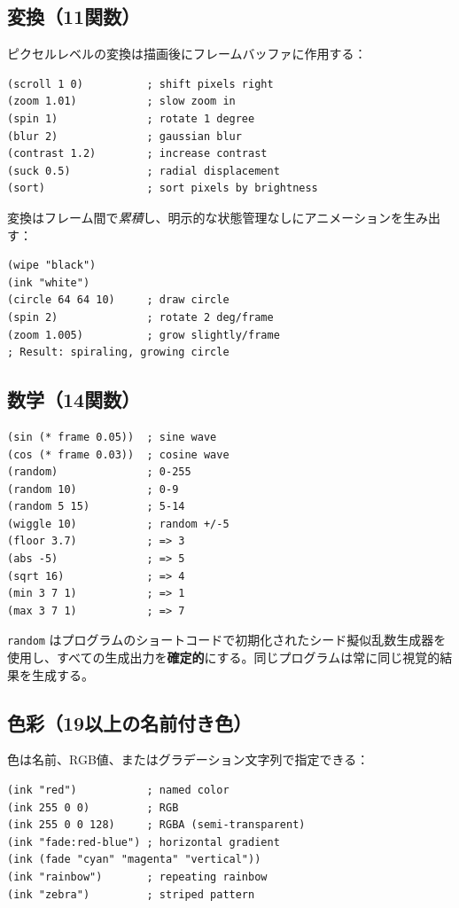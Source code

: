 \documentclass[10pt,letterpaper,twocolumn]{article}
\begin{document}
\subsection{変換（11関数）}

ピクセルレベルの変換は描画後にフレームバッファに作用する：

\begin{lstlisting}
(scroll 1 0)          ; shift pixels right
(zoom 1.01)           ; slow zoom in
(spin 1)              ; rotate 1 degree
(blur 2)              ; gaussian blur
(contrast 1.2)        ; increase contrast
(suck 0.5)            ; radial displacement
(sort)                ; sort pixels by brightness
\end{lstlisting}

変換はフレーム間で\emph{累積}し、明示的な状態管理なしにアニメーションを生み出す：

\begin{lstlisting}
(wipe "black")
(ink "white")
(circle 64 64 10)     ; draw circle
(spin 2)              ; rotate 2 deg/frame
(zoom 1.005)          ; grow slightly/frame
; Result: spiraling, growing circle
\end{lstlisting}

\subsection{数学（14関数）}

\begin{lstlisting}
(sin (* frame 0.05))  ; sine wave
(cos (* frame 0.03))  ; cosine wave
(random)              ; 0-255
(random 10)           ; 0-9
(random 5 15)         ; 5-14
(wiggle 10)           ; random +/-5
(floor 3.7)           ; => 3
(abs -5)              ; => 5
(sqrt 16)             ; => 4
(min 3 7 1)           ; => 1
(max 3 7 1)           ; => 7
\end{lstlisting}

\texttt{random} はプログラムのショートコードで初期化されたシード擬似乱数生成器を使用し、すべての生成出力を\textbf{確定的}にする。同じプログラムは常に同じ視覚的結果を生成する。

\subsection{色彩（19以上の名前付き色）}

色は名前、RGB値、またはグラデーション文字列で指定できる：

\begin{lstlisting}
(ink "red")           ; named color
(ink 255 0 0)         ; RGB
(ink 255 0 0 128)     ; RGBA (semi-transparent)
(ink "fade:red-blue") ; horizontal gradient
(ink (fade "cyan" "magenta" "vertical"))
(ink "rainbow")       ; repeating rainbow
(ink "zebra")         ; striped pattern
\end{lstlisting}
\end{document}
